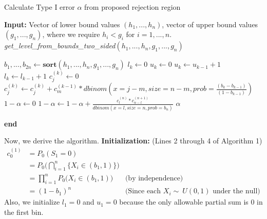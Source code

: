 \documentclass[article]{jss}
\begin{document}
\begin{algorithm}[H]
\caption{Calculate Type I error $\alpha$ from proposed rejection region}
\textbf{Input:} Vector of lower bound values $(h_{1}, ..., h_{n})$, vector of upper bound values $(g_{1}, ..., g_{n})$, where we require $h_{i} < g_{i}$ for $i = 1, ..., n$.
\newline
\textit{get\_level\_from\_bounds\_two\_sided}$(h_{1}, ..., h_{n}, g_{1}, ..., g_{n})$
\begin{algorithmic}[1]
\STATE $b_{1}, ..., b_{2n} \leftarrow \textbf{sort}(h_{1}, ..., h_{n}, g_{1}, ..., g_{n})$
\STATE $l_{k} \leftarrow 0$
\STATE $u_{k} \leftarrow 0$
\STATE $u_{k} \leftarrow u_{k - 1} + 1$
\ENDIF
{}
\STATE $l_{k} \leftarrow l_{k - 1} + 1$
\ENDIF
{}
\STATE $c_{j}^{(k)} \leftarrow 0 $
\STATE $c_{j}^{(k)} \leftarrow  c_{j}^{(k)} + c_{m}^{(k - 1)} * dbinom(x = j - m, size = n-m, prob = \frac{(b_{k} - b_{k - 1})}{(1 - b_{k - 1})})$
\ENDFOR
\ENDFOR
\ENDFOR
\STATE $1 - \alpha \leftarrow 0$
\STATE $1 - \alpha \leftarrow 1 - \alpha + \frac{c_{l}^{(n)} * c_{n - l}^{(n + 1)}}{dbinom(x = l, size = n, prob = b_{n})}$
\ENDFOR
\RETURN $\alpha$
\end{algorithmic}
\textbf{end}
\end{algorithm}
Now, we derive the algorithm. \textbf{Initialization:} (Lines 2 through 4 of Algorithm 1)
%
\begin{align*}
    c_{0}^{(1)} &= P_{0}(S_{1} = 0)\\
    &= P_{0}\Big(\bigcap\limits_{i=1}^{n}\{X_{i} \in (b_{1}, 1)\}\Big)\\
    &= \prod\limits_{i=1}^{n}P_{0}\Big(X_{i} \in (b_{1}, 1)\Big) &\textrm{(by independence)}\\
    &= (1 - b_{1})^{n} &\textrm{(Since each $X_{i} \sim~ U(0, 1)$ under the null)}
\end{align*}
%
Also, we initialize $l_{1} = 0$ and $u_{1} = 0$ because the only allowable partial sum is 0 in the first bin.
\end{document}
